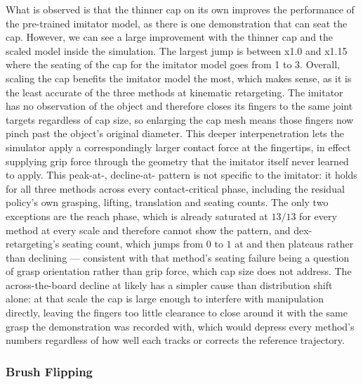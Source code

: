 What is observed is that the thinner cap on its own improves the performance of the pre-trained imitator model, as there is one demonstration that can seat the cap. However, we can see a large improvement with the thinner cap and the scaled model inside the simulation. The largest jump is between x1.0 and x1.15 where the seating of the cap for the imitator model goes from 1 to 3. Overall, scaling the cap benefits the imitator model the most, which makes sense, as it is the
least accurate of the three methods at kinematic retargeting. The imitator has no observation of
the object and therefore closes its fingers to the same joint targets regardless of cap size, so
enlarging the cap mesh means those fingers now pinch past the object's original diameter. This
deeper interpenetration lets the simulator apply a correspondingly larger contact force at the
fingertips, in effect supplying grip force through the geometry that the imitator itself never
learned to apply. This peak-at-, decline-at- pattern is not specific to the imitator:
it holds for all three methods across every contact-critical phase, including the residual policy's
own grasping, lifting, translation and seating counts. The only two exceptions are the reach phase,
which is already saturated at $13/13$ for every method at every scale and therefore cannot show the
pattern, and dex-retargeting's seating count, which jumps from $0$ to $1$ at  and
then plateaus rather than declining --- consistent with that method's seating failure being a
question of grasp orientation rather than grip force, which cap size does not address. The
across-the-board decline at  likely has a simpler cause than distribution shift
alone: at that scale the cap is large enough to interfere with manipulation directly, leaving the
fingers too little clearance to close around it with the same grasp the demonstration was recorded
with, which would depress every method's numbers regardless of how well each tracks or corrects the
reference trajectory.  

\subsubsection{Brush Flipping}

